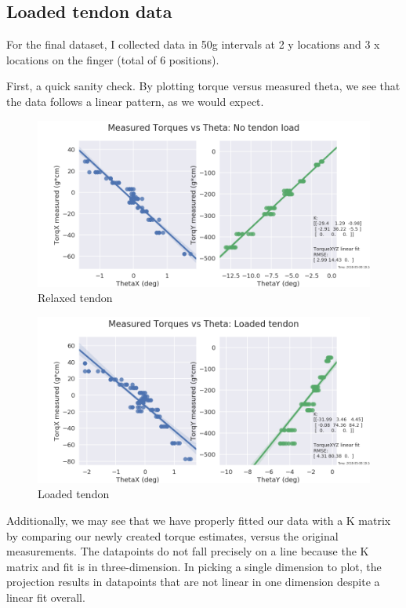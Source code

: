 \documentclass[preprint,12pt,3p]{elsarticle}
\begin{document}
\subsection{Loaded tendon data}

For the final dataset, I collected data in 50g intervals at 2 y locations and 3 x locations on the
finger (total of 6 positions). 

First, a quick sanity check. By plotting torque versus measured theta, we see that the data follows
a linear pattern, as we would expect.

\begin{figure}[H]
\centering
\includegraphics[width=\textwidth]{images/stiff/torqtheta.png}
\caption{Relaxed tendon}
\end{figure}


\begin{figure}[H]
\centering
\includegraphics[width=\textwidth]{images/stiff/torqtheta_loaded.png}
\caption{Loaded tendon}
\end{figure}

Additionally, we may see that we have properly fitted our data with a K matrix by comparing our
newly created torque estimates, versus the original measurements. The datapoints do not fall
precisely on a line because the K matrix and fit is in three-dimension. In picking a single
dimension to plot, the projection results in datapoints that are not linear in one dimension despite
a linear fit overall.
\end{document}
